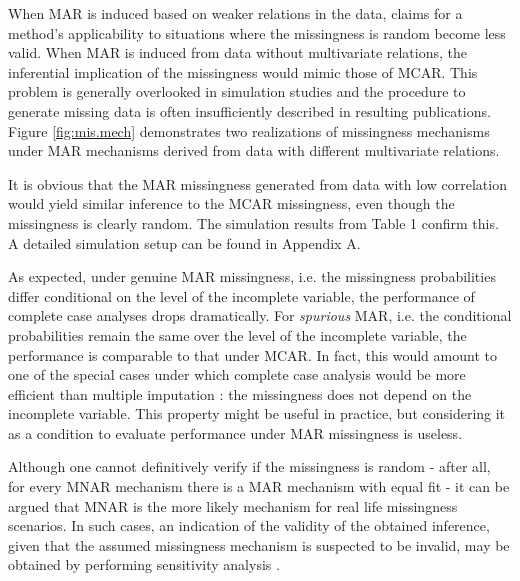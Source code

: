 \documentclass[12pt, a4paper]{article}
\begin{document}
When MAR is induced based on weaker relations in the data, claims for a method's applicability to situations where the missingness is random become less valid. When MAR is induced from data without multivariate relations, the inferential implication of the missingness would mimic those of MCAR. This problem is generally overlooked in simulation studies and the procedure to generate missing data is often insufficiently described in resulting publications. Figure \ref{fig:mis.mech} demonstrates two realizations of missingness mechanisms under MAR mechanisms derived from data with different multivariate relations. 

It is obvious that the MAR missingness generated from data with low correlation would yield similar inference to the MCAR missingness, even though the missingness is clearly random. The simulation results from Table 1 confirm this. A detailed simulation setup can be found in Appendix A. 

As expected, under genuine MAR missingness, i.e. the missingness probabilities differ conditional on the level of the incomplete variable, the performance of complete case analyses drops dramatically. For \emph{spurious} MAR, i.e. the conditional probabilities remain the same over the level of the incomplete variable, the performance is comparable to that under MCAR. In fact, this would amount to one of the special cases under which complete case analysis would be more efficient than multiple imputation \citep[see e.g.][p. 48]{fimd}: the missingness does not depend on the incomplete variable. This property might be useful in practice, but considering it as a condition to evaluate performance under MAR missingness is useless. 

Although one cannot definitively verify if the missingness is random - after all, for every MNAR mechanism there is a MAR mechanism with equal fit \citep{molenberghs2008every} - it can be argued that MNAR is the more likely mechanism for real life missingness scenarios. In such cases, an indication of the validity of the obtained inference, given that the assumed missingness mechanism is suspected to be invalid, may be obtained by performing sensitivity analysis \citep[see e.g.][part 5]{molenberghs2014handbook}.
\end{document}
